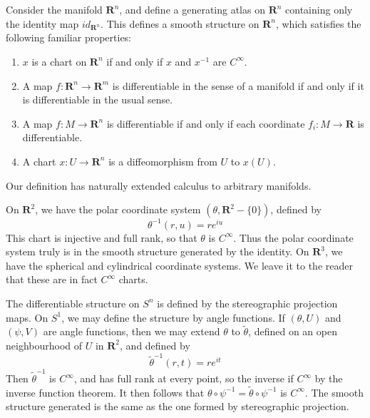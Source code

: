 \begin{example}
    Consider the manifold $\mathbf{R}^n$, and define a generating atlas on $\mathbf{R}^n$ containing only the identity map $id_{\mathbf{R}^n}$. This defines a smooth structure on $\mathbf{R}^n$, which satisfies the following familiar properties:
    \begin{enumerate}
        \item $x$ is a chart on $\mathbf{R}^n$ if and only if $x$ and $x^{-1}$ are $C^\infty$.
        \item A map $f:\mathbf{R}^n \to \mathbf{R}^m$ is differentiable in the sense of a manifold if and only if it is differentiable in the usual sense.
        \item A map $f:M \to \mathbf{R}^n$ is differentiable if and only if each coordinate $f_i:M \to \mathbf{R}$ is differentiable.
        \item A chart $x:U \to \mathbf{R}^n$ is a diffeomorphism from $U$ to $x(U)$.
    \end{enumerate}
    Our definition has naturally extended calculus to arbitrary manifolds.
\end{example}

\begin{example}
    On $\mathbf{R}^2$, we have the polar coordinate system $(\theta, \mathbf{R}^2 - \{0\})$, defined by
    \[ \theta^{-1}(r,u) = re^{iu} \]
    This chart is injective and full rank, so that $\theta$ is $C^\infty$. Thus the polar coordinate system truly is in the smooth structure generated by the identity. On $\mathbf{R}^3$, we have the spherical and cylindrical coordinate systems. We leave it to the reader that these are in fact $C^\infty$ charts.
\end{example}

\begin{example}
    The differentiable structure on $S^n$ is defined by the stereographic projection maps. On $S^1$, we may define the structure by angle functions. If $(\theta,U)$ and $(\psi,V)$ are angle functions, then we may extend $\theta$ to $\tilde{\theta}$, defined on an open neighbourhood of $U$ in $\mathbf{R}^2$, and defined by
    \[ \tilde{\theta}^{-1}(r,t) = re^{it} \]
    Then $\tilde{\theta}^{-1}$ is $C^\infty$, and has full rank at every point, so the inverse if $C^\infty$ by the inverse function theorem. It then follows that $\theta \circ \psi^{-1} = \tilde{\theta} \circ \psi^{-1}$ is $C^\infty$. The smooth structure generated is the same as the one formed by stereographic projection.
\end{example}

